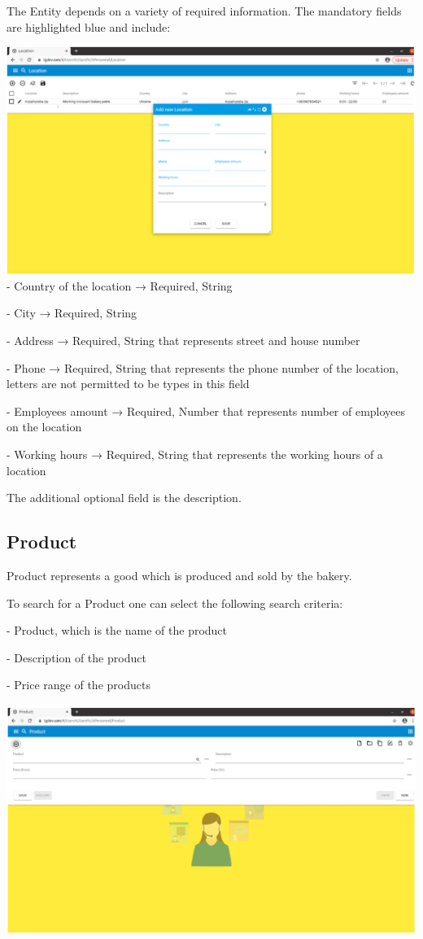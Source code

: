 The Entity depends on a variety of required information. The mandatory fields are highlighted blue and include:

\includegraphics[width=\textwidth]{sections/01-chapter/images/location3.png}\\

- Country of the location → Required, String

- City → Required, String

- Address → Required, String that represents street and house number

- Phone → Required, String that represents the phone number of the location, letters are not permitted to be types in this field

- Employees amount → Required, Number that represents number of employees on the location

- Working hours → Required, String that represents the working hours of a location

The additional optional field is the description.

\subsection{Product}

Product represents a good which is produced and sold by the bakery.

To search for a Product one can select the following search criteria:

- Product, which is the name of the product

- Description of the product

- Price range of the products

\includegraphics[width=\textwidth]{sections/01-chapter/images/product1.png}

